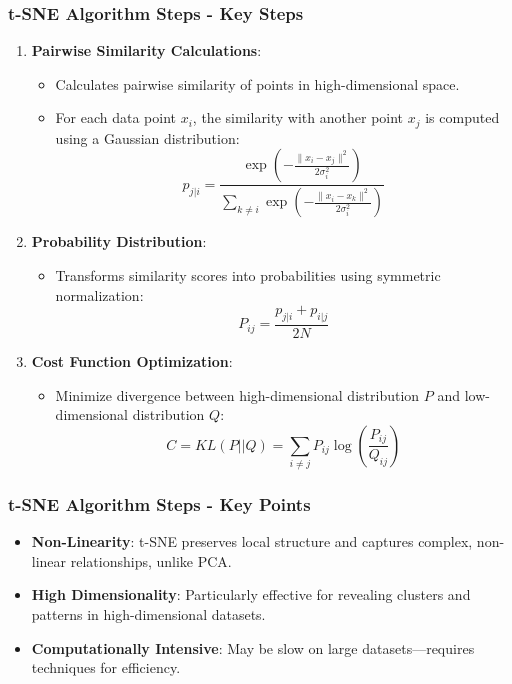 \documentclass{beamer}
\begin{document}
\begin{frame}[fragile]
    \frametitle{t-SNE Algorithm Steps - Key Steps}
    \begin{enumerate}
        \item \textbf{Pairwise Similarity Calculations}:
            \begin{itemize}
                \item Calculates pairwise similarity of points in high-dimensional space.
                \item For each data point \( x_i \), the similarity with another point \( x_j \) is computed using a Gaussian distribution:
                \begin{equation}
                    p_{j|i} = \frac{\exp\left(-\frac{\lVert x_i - x_j \rVert^2}{2\sigma_i^2}\right)}{\sum_{k \neq i} \exp\left(-\frac{\lVert x_i - x_k \rVert^2}{2\sigma_i^2}\right)}
                \end{equation}
            \end{itemize}

        \item \textbf{Probability Distribution}:
            \begin{itemize}
                \item Transforms similarity scores into probabilities using symmetric normalization:
                \begin{equation}
                    P_{ij} = \frac{p_{j|i} + p_{i|j}}{2N}
                \end{equation}
            \end{itemize}

        \item \textbf{Cost Function Optimization}:
            \begin{itemize}
                \item Minimize divergence between high-dimensional distribution \( P \) and low-dimensional distribution \( Q \):
                \begin{equation}
                    C = KL(P || Q) = \sum_{i \neq j} P_{ij} \log\left(\frac{P_{ij}}{Q_{ij}}\right)
                \end{equation}
            \end{itemize}
    \end{enumerate}
\end{frame}

\begin{frame}[fragile]
    \frametitle{t-SNE Algorithm Steps - Key Points}
    \begin{itemize}
        \item \textbf{Non-Linearity}: t-SNE preserves local structure and captures complex, non-linear relationships, unlike PCA.
        \item \textbf{High Dimensionality}: Particularly effective for revealing clusters and patterns in high-dimensional datasets.
        \item \textbf{Computationally Intensive}: May be slow on large datasets—requires techniques for efficiency.
    \end{itemize}
\end{frame}
\end{document}
